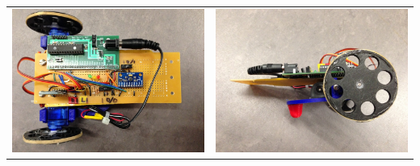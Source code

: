 \documentclass[]{article}
\begin{document}
\begin{longtable}[]{@{}ll@{}}
\toprule
\includegraphics{top_view.jpg} &
\includegraphics{side_view.jpg}\tabularnewline

\end{longtable}
\end{document}
